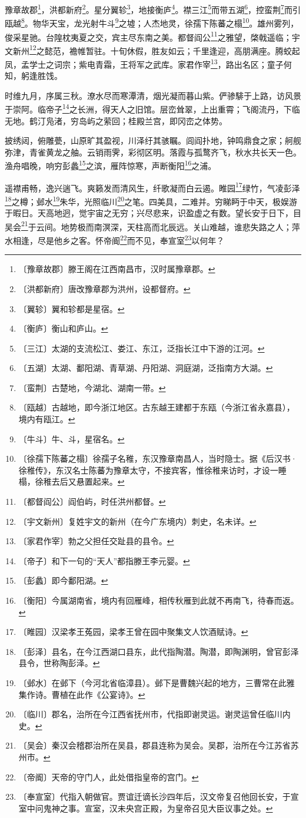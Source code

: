 \documentclass[12pt,UTF-8,openany,a4]{ctexbook}
\begin{document}
\begin{large}
    
    豫章故郡\footnote{〔豫章故郡〕\yiwen 滕王阁在江西南昌市，汉时属豫章郡。}，洪都新府\footnote{〔洪都新府〕\yiwen 唐改豫章郡为洪州，设都督府。}。星分翼轸\footnote{〔翼轸〕\yiwen 翼和轸都是星宿。}，地接衡庐\footnote{〔衡庐〕\yiwen 衡山和庐山。}。襟三江\footnote{〔三江〕\yiwen 太湖的支流松江、娄江、东江，泛指长江中下游的江河。}而带五湖\footnote{〔五湖〕\yiwen 太湖、鄱阳湖、青草湖、丹阳湖、洞庭湖，泛指南方大湖。}，控蛮荆\footnote{〔蛮荆〕\yiwen 古楚地，今湖北、湖南一带。}而引瓯越\footnote{〔瓯越〕\yiwen 古越地，即今浙江地区。古东越王建都于东瓯（今浙江省永嘉县），境内有瓯江。}。物华天宝，龙光射牛斗\footnote{〔牛斗〕\yiwen 牛、斗，星宿名。}之墟；人杰地灵，徐孺下陈蕃之榻\footnote{〔徐孺下陈蕃之榻〕\yiwen 徐孺子名稚，东汉豫章南昌人，当时隐士。据《后汉书·徐稚传》，东汉名士陈蕃为豫章太守，不接宾客，惟徐稚来访时，才设一睡榻，徐稚去后又悬置起来。}。雄州雾列，俊采星驰。台隍枕夷夏之交，宾主尽东南之美。都督阎公\footnote{〔都督阎公〕\yiwen 阎伯屿，时任洪州都督。}之雅望，棨戟遥临；宇文新州\footnote{〔宇文新州〕\yiwen 复姓宇文的新州（在今广东境内）刺史，名未详。}之懿范，襜帷暂驻。十旬休假，胜友如云；千里逢迎，高朋满座。腾蛟起凤，孟学士之词宗；紫电青霜，王将军之武库。家君作宰\footnote{〔家君作宰〕\yiwen 勃之父担任交趾县的县令。}，路出名区；童子何知，躬逢胜饯。
    
    时维九月，序属三秋。潦水尽而寒潭清，烟光凝而暮山紫。俨骖騑于上路，访风景于崇阿。临帝子\footnote{〔帝子〕\yiwen 和下一句的“天人”都指滕王李元婴。}之长洲，得天人之旧馆。层峦耸翠，上出重霄；飞阁流丹，下临无地。鹤汀凫渚，穷岛屿之萦回；桂殿兰宫，即冈峦之体势。
    
    披绣闼，俯雕甍，山原旷其盈视，川泽纡其骇瞩。闾阎扑地，钟鸣鼎食之家；舸舰弥津，青雀黄龙之舳。云销雨霁，彩彻区明。落霞与孤鹜齐飞，秋水共长天一色。渔舟唱晚，响穷彭蠡\footnote{〔彭蠡〕\yiwen 即今鄱阳湖。}之滨，雁阵惊寒，声断衡阳\footnote{〔衡阳〕\yiwen 今属湖南省，境内有回雁峰，相传秋雁到此就不再南飞，待春而返。}之浦。
    
    遥襟甫畅，逸兴遄飞。爽籁发而清风生，纤歌凝而白云遏。睢园\footnote{〔睢园〕\yiwen 汉梁孝王菟园，梁孝王曾在园中聚集文人饮酒赋诗。}绿竹，气凌彭泽\footnote{〔彭泽〕\yiwen 县名，在今江西湖口县东，此代指陶潜。陶潜，即陶渊明，曾官彭泽县令，世称陶彭泽。}之樽；邺水\footnote{〔邺水〕\yiwen 在邺下（今河北省临漳县）。邺下是曹魏兴起的地方，三曹常在此雅集作诗。曹植在此作《公宴诗》。}朱华，光照临川\footnote{〔临川〕\yiwen 郡名，治所在今江西省抚州市，代指即谢灵运。谢灵运曾任临川内史。}之笔。四美具，二难并。穷睇眄于中天，极娱游于暇日。天高地迥，觉宇宙之无穷；兴尽悲来，识盈虚之有数。望长安于日下，目吴会\footnote{〔吴会〕\yiwen 秦汉会稽郡治所在吴县，郡县连称为吴会。吴郡，治所在今江苏省苏州市。}于云间。地势极而南溟深，天柱高而北辰远。关山难越，谁悲失路之人；萍水相逢，尽是他乡之客。怀帝阍\footnote{〔帝阍〕\yiwen 天帝的守门人，此处借指皇帝的宫门。}而不见，奉宣室\footnote{〔奉宣室〕\yiwen 代指入朝做官。贾谊迁谪长沙四年后，汉文帝复召他回长安，于宣室中问鬼神之事。宣室，汉未央宫正殿，为皇帝召见大臣议事之处。}以何年？
    

\end{large}
\end{document}
